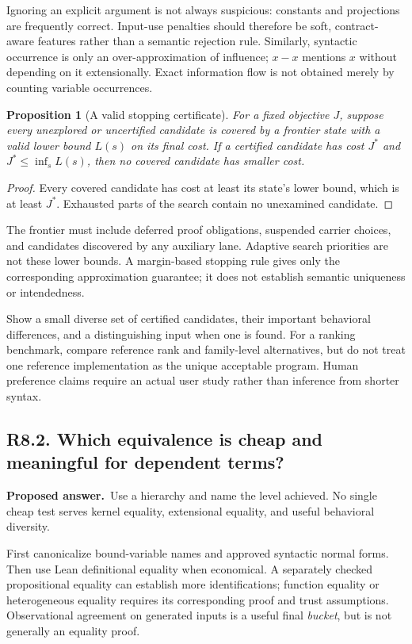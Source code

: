 \documentclass[11pt,a4paper]{article}
\newcommand{\question}[2]{\subsection{#1. #2}\label{q:#1}}
\newcommand{\answer}{\textbf{Proposed answer.}\ }
\newtheorem{proposition}{Proposition}[section]
\theoremstyle{remark}
\begin{document}
Ignoring an explicit argument is not always suspicious: constants and
projections are frequently correct. Input-use penalties should therefore be
soft, contract-aware features rather than a semantic rejection rule.
Similarly, syntactic occurrence is only an over-approximation of influence;
$x-x$ mentions $x$ without depending on it extensionally. Exact information
flow is not obtained merely by counting variable occurrences.

\begin{proposition}[A valid stopping certificate]\label{prop:stopping}
For a fixed objective $J$, suppose every unexplored or uncertified candidate
is covered by a frontier state with a valid lower bound $L(s)$ on its final
cost. If a certified candidate has cost $J^*$ and
$J^*\leq\inf_s L(s)$, then no covered candidate has smaller cost.
\end{proposition}
\begin{proof}
Every covered candidate has cost at least its state's lower bound, which is
at least $J^*$. Exhausted parts of the search contain no unexamined candidate.
\end{proof}

The frontier must include deferred proof obligations, suspended carrier
choices, and candidates discovered by any auxiliary lane. Adaptive search
priorities are not these lower bounds. A margin-based stopping rule gives
only the corresponding approximation guarantee; it does not establish
semantic uniqueness or intendedness.

Show a small diverse set of certified candidates, their important behavioral
differences, and a distinguishing input when one is found. For a ranking
benchmark, compare reference rank and family-level alternatives, but do not
treat one reference implementation as the unique acceptable program. Human
preference claims require an actual user study rather than inference from
shorter syntax.

\question{R8.2}{Which equivalence is cheap and meaningful for dependent terms?}

\answer Use a hierarchy and name the level achieved. No single cheap test
serves kernel equality, extensional equality, and useful behavioral diversity.

First canonicalize bound-variable names and approved syntactic normal forms.
Then use Lean definitional equality when economical. A separately checked
propositional equality can establish more identifications; function equality
or heterogeneous equality requires its corresponding proof and trust
assumptions. Observational agreement on generated inputs is a useful final
\emph{bucket}, but is not generally an equality proof.
\end{document}
